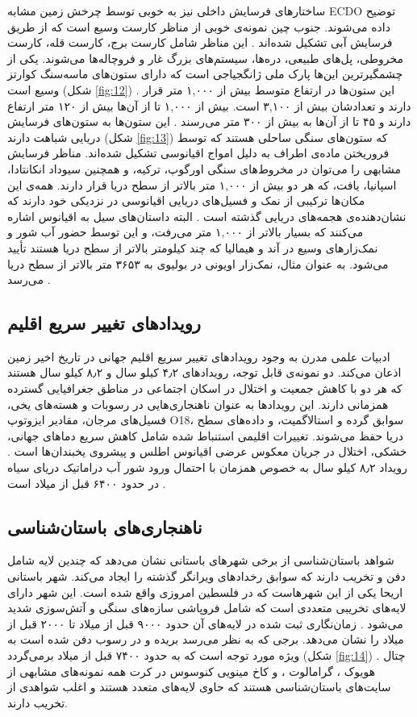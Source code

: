 \documentclass[10pt,twocolumn,letterpaper]{article}
\begin{document}
ساختارهای فرسایش داخلی نیز به خوبی توسط چرخش زمین مشابه ECDO توضیح داده می‌شوند. جنوب چین نمونه‌ی خوبی از مناظر کارست وسیع است که از طریق فرسایش آبی تشکیل شده‌اند \cite{82}. این مناظر شامل کارست برج، کارست قله، کارست مخروطی، پل‌های طبیعی، دره‌ها، سیستم‌های بزرگ غار و فروچاله‌ها می‌شوند. یکی از چشمگیرترین این‌ها پارک ملی ژانگجیاجی است که دارای ستون‌های ماسه‌سنگ کوارتز وسیع است (شکل \ref{fig:12}) \cite{84}. این ستون‌ها در ارتفاع متوسط بیش از ۱,۰۰۰ متر قرار دارند و تعدادشان بیش از ۳,۱۰۰ است. بیش از ۱,۰۰۰ تا از آن‌ها بیش از ۱۲۰ متر ارتفاع دارند و ۴۵ تا از آن‌ها به بیش از ۳۰۰ متر می‌رسند \cite{85}. این ستون‌ها به ستون‌های فرسایش دریایی شباهت دارند (شکل \ref{fig:13}) که ستون‌های سنگی ساحلی هستند که توسط فروریختن ماده‌ی اطراف به دلیل امواج اقیانوسی تشکیل شده‌اند. مناظر فرسایش مشابهی را می‌توان در مخروط‌های سنگی اورگوپ، ترکیه، و همچنین سیوداد انکانتادا، اسپانیا، یافت، که هر دو بیش از ۱,۰۰۰ متر بالاتر از سطح دریا قرار دارند. همه‌ی این مکان‌ها ترکیبی از نمک و فسیل‌های دریایی اقیانوسی در نزدیکی خود دارند که نشان‌دهنده‌ی هجمه‌های دریایی گذشته است \cite{15,86,87}. البته داستان‌های سیل \cite{3} به اقیانوس اشاره می‌کنند که بسیار بالاتر از ۱,۰۰۰ متر می‌رفت، و این توسط حضور آب شور و نمک‌زارهای وسیع در آند و هیمالیا که چند کیلومتر بالاتر از سطح دریا هستند تأیید می‌شود. به عنوان مثال، نمک‌زار اویونی در بولیوی به ۳۶۵۳ متر بالاتر از سطح دریا می‌رسد \cite{94}.

\subsection{رویدادهای تغییر سریع اقلیم}

ادبیات علمی مدرن به وجود رویدادهای تغییر سریع اقلیم جهانی در تاریخ اخیر زمین اذعان می‌کند. دو نمونه‌ی قابل توجه، رویدادهای ۴٫۲ کیلو سال و ۸٫۲ کیلو سال هستند که هر دو با کاهش جمعیت و اختلال در اسکان اجتماعی در مناطق جغرافیایی گسترده همزمانی دارند. این رویدادها به عنوان ناهنجاری‌هایی در رسوبات و هسته‌های یخی، فسیل‌های مرجان، مقادیر ایزوتوپ O18، سوابق گرده و استالاگمیت، و داده‌های سطح دریا حفظ می‌شوند. تغییرات اقلیمی استنباط شده شامل کاهش سریع دماهای جهانی، خشکی، اختلال در جریان معکوس عرضی اقیانوس اطلس و پیشروی یخبندان‌ها است \cite{90,91,92}. رویداد ۸٫۲ کیلو سال به خصوص همزمان با احتمال ورود شور آب دراماتیک دریای سیاه در حدود ۶۴۰۰ قبل از میلاد است \cite{93}.

\subsection{ناهنجاری‌های باستان‌شناسی}

شواهد باستان‌شناسی از برخی شهرهای باستانی نشان می‌دهد که چندین لایه شامل دفن و تخریب دارند که سوابق رخدادهای ویرانگر گذشته را ایجاد می‌کند. شهر باستانی اریحا یکی از این شهرهاست که در فلسطین امروزی واقع شده است. این شهر دارای لایه‌های تخریبی متعددی است که شامل فروپاشی سازه‌های سنگی و آتش‌سوزی شدید می‌شود \cite{96,97}. زمان‌نگاری ثبت شده در لایه‌های آن حدود ۹۰۰۰ قبل از میلاد تا ۲۰۰۰ قبل از میلاد را نشان می‌دهد. برجی که به نظر می‌رسد بریده و در رسوب دفن شده است به ویژه مورد توجه است که به حدود ۷۴۰۰ قبل از میلاد برمی‌گردد (شکل \ref{fig:14}) \cite{95}. چتال هویوک \cite{99}، گرامالوت \cite{98}، و کاخ مینویی کنوسوس در کرت \cite{100,101} همه نمونه‌های مشابهی از سایت‌های باستان‌شناسی هستند که حاوی لایه‌های متعدد هستند و اغلب شواهدی از تخریب دارند.
\end{document}
